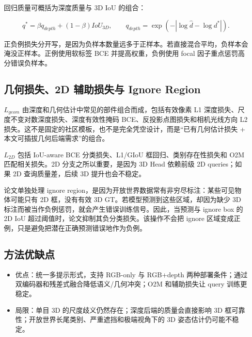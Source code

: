 回归质量可概括为深度质量与 3D IoU 的组合：

\begin{equation}
    q^* = \beta q_{depth} + (1-\beta) IoU_{3D}, \qquad
    q_{depth}=\exp(-|\log \hat d-\log d^*|).
\end{equation}

正负例损失分开写，是因为负样本数量远多于正样本。若直接混合平均，负样本会淹没正样本。正例使用软标签 BCE 并提高权重，负例使用 focal 因子重点惩罚高分错误负样本。

\subsection{几何损失、2D 辅助损失与 Ignore Region}

$L_{geom}$ 由深度和几何估计中常见的部件组合而成，包括有效像素 L1 深度损失、尺度不变对数深度损失、深度有效性掩码 BCE、反投影点图损失和相机光线方向 L2 损失。这不是固定的社区模板，也不是完全凭空设计，而是“已有几何估计损失 + 本文可插拔几何后端需求”的组合。

$L_{2D}$ 包括 IoU-aware BCE 分类损失、L1/GIoU 框回归、类别存在性损失和 O2M 匹配相关损失。2D 分支之所以重要，是因为 3D Head 依赖前级 2D queries；如果 2D 查询质量差，后续 3D 提升也会不稳定。

论文单独处理 ignore region，是因为开放世界数据常有非穷尽标注：某些可见物体可能只有 2D 框，没有有效 3D GT。若模型预测到这些区域，却因为缺少 3D 标注而被当作负例惩罚，就会产生错误训练信号。因此，当预测与 ignore box 的 2D IoU 超过阈值时，论文抑制其负分类损失。该操作不会把 ignore 区域变成正例，只是避免把潜在正确预测错误地作为负例。

\subsection{方法优缺点}

\begin{itemize}
    \item 优点：统一多提示形式，支持 RGB-only 与 RGB+depth 两种部署条件；通过双编码器和残差式融合降低语义/几何冲突；O2M 和辅助损失让 query 训练更稳定。
    \item 局限：单目 3D 的尺度歧义仍然存在；深度后端的质量会直接影响 3D 框可靠性；开放世界长尾类别、严重遮挡和极端视角下的 3D 姿态估计仍可能不稳定。
\end{itemize}
